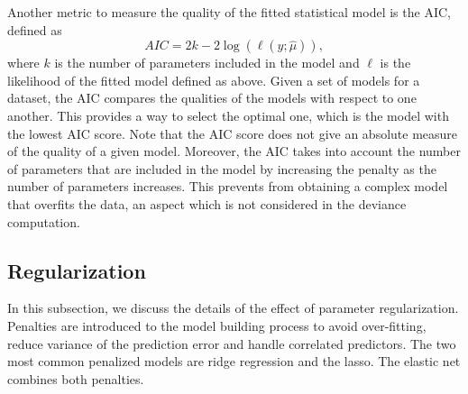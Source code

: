 %

Another metric to measure the quality of the fitted statistical model is the AIC, defined as
$$AIC = 2k -2\log(\ell(y;\hat{\mu})),$$
where $k$ is the number of parameters included in the model and $\ell$ is the likelihood of the fitted model defined as above.
 Given a set of models for a dataset, the AIC compares the qualities of the models with respect to one another. This provides a way to select the optimal one, which is the model with the lowest AIC score. Note that the AIC score does not give an absolute measure of the quality of a given model. Moreover, the AIC takes into account the number of parameters that are included in the model by increasing the penalty as the number of parameters increases. This prevents from obtaining a complex model that overfits the data, an aspect which is not considered in the deviance computation.
 
%
%

\subsection{Regularization} \label{regularization}
In this subsection, we discuss the details of the effect of parameter regularization. Penalties are introduced to the model building process to avoid over-fitting, reduce variance of the prediction error and handle correlated predictors. The two most common penalized models are ridge regression and the
lasso. The elastic net combines both penalties. 

